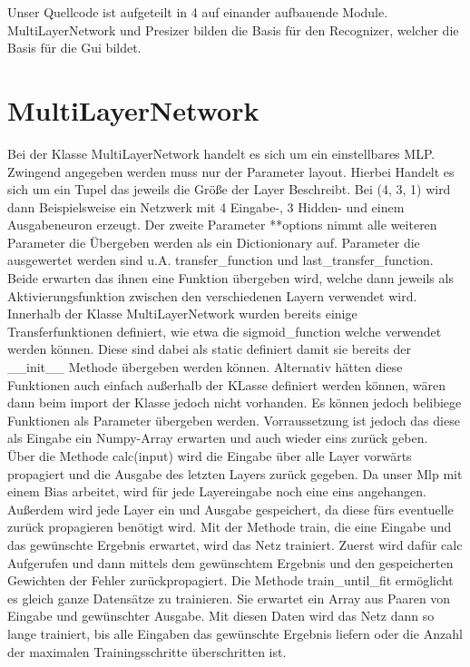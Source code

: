 \documentclass[a4paper]{article}
\title{\trtitle}
\author{\trauthor}
\date{\today}
\begin{document}
	\maketitle
	\pagebreak

	\noindent
	Unser Quellcode ist aufgeteilt in 4 auf einander aufbauende Module. MultiLayerNetwork und Presizer bilden die 
	Basis für den Recognizer, welcher die Basis für die Gui bildet.
	
	\section{MultiLayerNetwork}
		Bei der Klasse MultiLayerNetwork handelt es sich um ein einstellbares MLP. 
		Zwingend angegeben werden muss nur der Parameter layout. Hierbei Handelt es sich 
		um ein Tupel das jeweils die Größe der Layer Beschreibt. Bei (4, 3, 1) wird
		dann Beispielsweise ein Netzwerk mit 4 Eingabe-, 3 Hidden- und einem Ausgabeneuron 
		erzeugt. Der zweite Parameter **options nimmt alle weiteren Parameter die Übergeben
		werden als ein Dictionionary auf. Parameter die ausgewertet werden sind u.A. transfer\_function
		und last\_transfer\_function. Beide erwarten das ihnen eine Funktion übergeben wird, welche dann
		jeweils als Aktivierungsfunktion zwischen den verschiedenen Layern verwendet wird.
		Innerhalb der Klasse MultiLayerNetwork wurden bereits einige Transferfunktionen definiert,
		wie etwa die sigmoid\_function welche verwendet werden können. Diese sind dabei als static definiert
		damit sie bereits der \_\_init\_\_ Methode übergeben werden können. Alternativ hätten diese Funktionen
		auch einfach außerhalb der KLasse definiert werden können, wären dann beim import der Klasse jedoch nicht vorhanden.
		Es können jedoch belibiege Funktionen als Parameter übergeben werden. Vorraussetzung ist jedoch das diese als Eingabe
		ein Numpy-Array erwarten und auch wieder eins zurück geben. \\
		\noindent
		Über die Methode calc(input) wird die Eingabe über alle Layer vorwärts propagiert und die Ausgabe des letzten Layers 
		zurück gegeben. Da unser Mlp mit einem Bias arbeitet, wird für jede Layereingabe noch eine eins angehangen.
		Außerdem wird jede Layer ein und Ausgabe gespeichert, da diese fürs eventuelle zurück propagieren benötigt wird.
		Mit der Methode train, die eine Eingabe und das gewünschte Ergebnis erwartet, wird das Netz trainiert.
		Zuerst wird dafür calc Aufgerufen und dann mittels dem gewünschtem Ergebnis und den gespeicherten Gewichten der
		Fehler zurückpropagiert. 
		Die Methode train\_until\_fit ermöglicht es gleich ganze Datensätze zu trainieren. Sie erwartet ein Array aus 
		Paaren von Eingabe und gewünschter Ausgabe. Mit diesen Daten wird das Netz dann so lange trainiert, bis alle
		Eingaben das gewünschte Ergebnis liefern oder die Anzahl der maximalen Trainingsschritte überschritten ist. 
\end{document}

